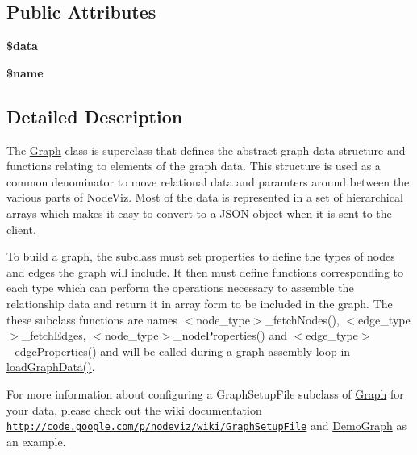 \subsection*{Public Attributes}
\begin{DoxyCompactItemize}
\item 
\hypertarget{classGraph_af6af3c2ca091fb5b322717f76e29d9da}{
{\bfseries \$data}}
\label{classGraph_af6af3c2ca091fb5b322717f76e29d9da}

\item 
\hypertarget{classGraph_a30024815ae1797b4e6999919544a864a}{
{\bfseries \$name}}
\label{classGraph_a30024815ae1797b4e6999919544a864a}

\end{DoxyCompactItemize}


\subsection{Detailed Description}
The \hyperlink{classGraph}{Graph} class is superclass that defines the abstract graph data structure and functions relating to elements of the graph data. This structure is used as a common denominator to move relational data and paramters around between the various parts of NodeViz. Most of the data is represented in a set of hierarchical arrays which makes it easy to convert to a JSON object when it is sent to the client. \par
\par
 To build a graph, the subclass must set properties to define the types of nodes and edges the graph will include. It then must define functions corresponding to each type which can perform the operations necessary to assemble the relationship data and return it in array form to be included in the graph. The these subclass functions are names $<$node\_\-type$>$\_\-fetchNodes(), $<$edge\_\-type$>$\_\-fetchEdges, $<$node\_\-type$>$\_\-nodeProperties() and $<$edge\_\-type$>$\_\-edgeProperties() and will be called during a graph assembly loop in \hyperlink{classGraph_ac010f0389fcc16ee975d03af5aaa1dae}{loadGraphData()}. \par
\par
 For more information about configuring a GraphSetupFile subclass of \hyperlink{classGraph}{Graph} for your data, please check out the wiki documentation \href{http://code.google.com/p/nodeviz/wiki/GraphSetupFile}{\tt http://code.google.com/p/nodeviz/wiki/GraphSetupFile} and \hyperlink{classDemoGraph}{DemoGraph} as an example. 


